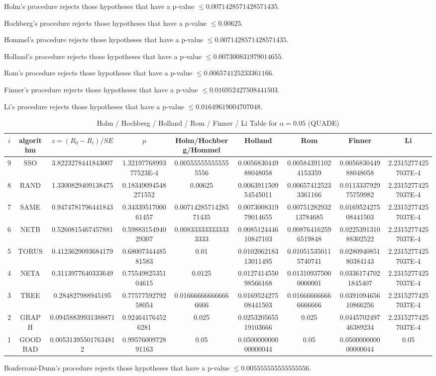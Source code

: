 \documentclass[a4paper,10pt]{article}
\begin{document}
\begin{landscape}
Holm's procedure rejects those hypotheses that have a p-value $\le0.0071428571428571435$.


Hochberg's procedure rejects those hypotheses that have a p-value $\le0.00625$.


Hommel's procedure rejects those hypotheses that have a p-value $\le0.0071428571428571435$.


Holland's procedure rejects those hypotheses that have a p-value $\le0.007300831979014655$.


Rom's procedure rejects those hypotheses that have a p-value $\le0.006574125233361166$.


Finner's procedure rejects those hypotheses that have a p-value $\le0.016952427508441503$.


Li's procedure rejects those hypotheses that have a p-value $\le0.01649619004707048$.



\newpage

\begin{table}[!htp]
\centering\scriptsize
\caption{Holm / Hochberg / Holland / Rom / Finner / Li Table for $\alpha=0.05$ (QUADE)}
\begin{tabular}{ccccccccc}
$i$&algorithm&$z=(R_0 - R_i)/SE$&$p$&Holm/Hochberg/Hommel&Holland&Rom&Finner&Li\\
\hline
9& SSO&3.8223278441843007&1.3219776899377523E-4&0.005555555555555556&0.005683044988048058&0.005843911024153359&0.005683044988048058&2.23152774257037E-4\\
8& RAND&1.3300829409138475&0.18349094548271552&0.00625&0.006391150954545011&0.006574125233361166&0.011333792975759982&2.23152774257037E-4\\
7& SAME&0.9474781796441843&0.3433951700061457&0.0071428571428571435&0.007300831979014655&0.0075128293213784685&0.016952427508441503&2.23152774257037E-4\\
6& NETB&0.5260815467457881&0.5988315494029307&0.008333333333333333&0.008512444610847103&0.008764162596519848&0.022539131088302522&2.23152774257037E-4\\
5& TORUS&0.4123629093684179&0.6800734448581583&0.01&0.010206218313011495&0.010515350115740741&0.028094085180384143&2.23152774257037E-4\\
4& NETA&0.3113977640333649&0.7554982535104615&0.0125&0.012741455098566168&0.013109375000000001&0.03361747021845407&2.23152774257037E-4\\
3& TREE&0.284827988945195&0.7757759279258054&0.016666666666666666&0.016952427508441503&0.016666666666666666&0.039109465610866256&2.23152774257037E-4\\
2& GRAPH&0.09458839931388871&0.924641764526281&0.025&0.025320565519103666&0.025&0.044570249746389234&2.23152774257037E-4\\
1& GOODBAD&0.005313955017634812&0.9957600972891163&0.05&0.050000000000000044&0.05&0.050000000000000044&0.05\\
\hline
\end{tabular}
\end{table}
Bonferroni-Dunn's procedure rejects those hypotheses that have a p-value $\le0.005555555555555556$.



\end{landscape}
\end{document}

